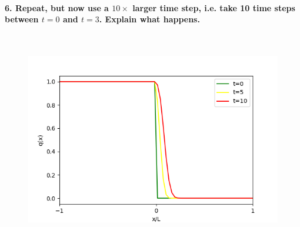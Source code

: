 \paragraph{6. Repeat, but now use a $10\times$ larger time 
    step, i.e. take 10 time steps between $t=0$ and $t=3$. 
    Explain what happens.
} \ \\
    \begin{figure}[h!]
        \centering
        \includegraphics[width=.6\textwidth]{../figures/upwind_7.png}
        \caption{}
    \end{figure} \ \\ 

